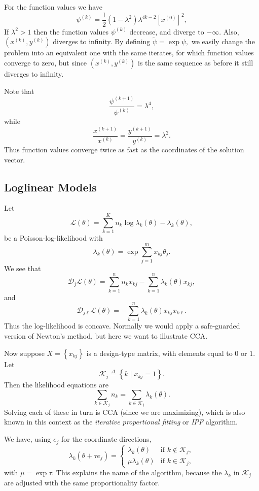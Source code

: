 \documentclass[
  12pt,
]{book}
\begin{document}
For the function values we have
\[
\psi^{(k)}=\frac{1}{2}(1-\lambda^{2})\lambda^{4k-2}[x^{(0)}]^{2},
\]
If \(\lambda^2>1\) then the function values \(\psi^{(k)}\)
decrease, and diverge to \(-\infty\). Also, \((x^{(k)},y^{(k)})\) diverges to infinity. By defining \(\tilde\psi=\exp\psi,\) we easily change the problem into an
equivalent one with the same iterates, for which function
values converge to zero,
but since \((x^{(k)},y^{(k)})\) is the same sequence as before it still diverges to infinity.

Note that
\[
\frac{\psi^{(k+1)}}{\psi^{(k)}}=\lambda^4,
\]
while
\[
\frac{x^{(k+1)}}{x^{(k)}}=\frac{y^{(k+1)}}{y^{(k)}}=
\lambda^2.
\]
Thus function values converge twice as fast as the coordinates of the solution vector.

\hypertarget{coordinatedescent:examples:loglinearmodels}{%
\subsection{Loglinear Models}\label{coordinatedescent:examples:loglinearmodels}}

Let
\[
\mathcal{L}(\theta)=\sum_{k=1}^K n_k\log\lambda_k(\theta)-\lambda_k(\theta),
\]
be a Poisson-log-likelihood with
\[
\lambda_k(\theta)=\exp\sum_{j=1}^m x_{kj}\theta_j.
\]
We see that
\[
\mathcal{D}_j\mathcal{L}(\theta)=\sum_{k=1}^n n_kx_{kj}-\sum_{k=1}^n \lambda_k(\theta)x_{kj},
\]
and
\[
\mathcal{D}_{j\ell}\mathcal{L}(\theta)=-\sum_{k=1}^n\lambda_k(\theta)x_{kj}x_{k\ell}.
\]
Thus the log-likelihood is concave. Normally we would apply a safe-guarded version of Newton's method, but here we want to illustrate CCA.

Now suppose \(X=\left\{x_{kj}\right\}\) is a design-type matrix, with elements
equal to \(0\) or \(1.\) Let
\[
\mathcal{K}_j\mathop{=}\limits^{\Delta}\left\{k\mid x_{kj}=1\right\}.
\]
Then the likelihood equations are
\[
\sum_{k\in\mathcal{K}_j}n_k=\sum_{k\in\mathcal{K}_j}\lambda_k(\theta).
\]
Solving each of these in turn is CCA (since we are maximizing),
which is also known in this context as
the \emph{iterative propertional fitting} or \emph{IPF} algorithm.

We have, using \(e_j\) for the coordinate directions,
\[
\lambda_k(\theta+\tau e_j)=\begin{cases}
\lambda_k(\theta)& \text{if $k\not\in\mathcal{K}_j$,}\\
\mu\lambda_k(\theta)& \text{if $k\in\mathcal{K}_j$},
\end{cases}
\]
with \(\mu=\exp\tau.\) This explains the name of the algorithm, because the \(\lambda_k\)
in \(\mathcal{K}_j\) are adjusted with the same proportionality factor.
\end{document}
